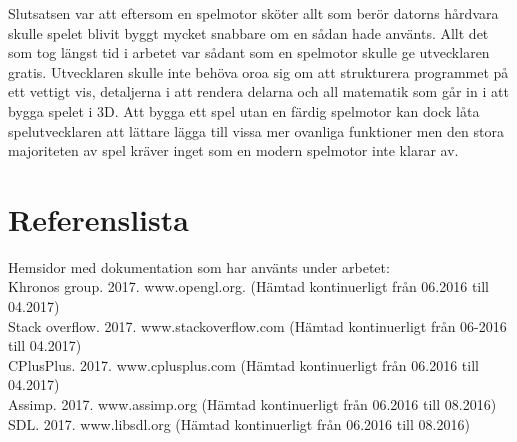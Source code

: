 \documentclass[12pt, a4paper]{article}
\begin{document}
	Slutsatsen var att eftersom en spelmotor sköter allt som berör datorns hårdvara skulle spelet blivit byggt mycket snabbare om en sådan hade använts. Allt det som tog längst tid i arbetet var sådant som en spelmotor skulle ge utvecklaren gratis. Utvecklaren skulle inte behöva oroa sig om att strukturera programmet på ett vettigt vis, detaljerna i att rendera delarna och all matematik som går in i att bygga spelet i 3D. Att bygga ett spel utan en färdig spelmotor kan dock låta spelutvecklaren att lättare lägga till vissa mer ovanliga funktioner men den stora majoriteten av spel kräver inget som en modern spelmotor inte klarar av. 
	
	\newpage
	\section{Referenslista}
	Hemsidor med dokumentation som har använts under arbetet: \\
	
	\noindent Khronos group. 2017. www.opengl.org. (Hämtad kontinuerligt från 06.2016 till 04.2017) \\
	Stack overflow. 2017. www.stackoverflow.com (Hämtad kontinuerligt från 06-2016 till 04.2017) \\
	CPlusPlus. 2017. www.cplusplus.com (Hämtad kontinuerligt från 06.2016 till 04.2017) \\
	Assimp. 2017. www.assimp.org (Hämtad kontinuerligt från 06.2016 till 08.2016) \\
	SDL. 2017. www.libsdl.org (Hämtad kontinuerligt från 06.2016 till 08.2016) \\
	
\end{document}
